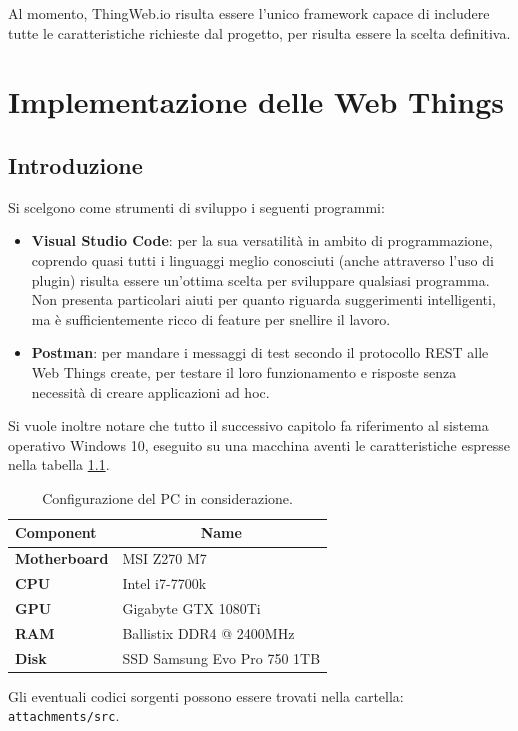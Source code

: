 \documentclass[12pt,a4paper,openright,oneside]{report}
\begin{document}
Al momento, ThingWeb.io risulta essere l'unico framework capace di includere tutte le caratteristiche richieste dal progetto, per risulta essere la scelta definitiva.


\clearpage{\pagestyle{empty}\cleardoublepage}
\chapter{Implementazione delle Web Things}           %
\lhead[\fancyplain{}{\bfseries\thepage}]{\fancyplain{}{\bfseries\rightmark}}  

\section{Introduzione}

Si scelgono come strumenti di sviluppo i seguenti programmi:

\begin{itemize}
	\item \textbf{Visual Studio Code}: per la sua versatilità in ambito di programmazione, coprendo quasi tutti i linguaggi meglio conosciuti (anche attraverso l'uso di plugin) risulta essere un'ottima scelta per sviluppare qualsiasi programma. Non presenta particolari aiuti per quanto riguarda suggerimenti intelligenti, ma è sufficientemente ricco di feature per snellire il lavoro.
	
	\item \textbf{Postman}: per mandare i messaggi di test secondo il protocollo REST alle Web Things create, per testare il loro funzionamento e risposte senza necessità di creare applicazioni ad hoc.
\end{itemize}

Si vuole inoltre notare che tutto il successivo capitolo fa riferimento al sistema operativo Windows 10, eseguito su una macchina aventi le caratteristiche espresse nella tabella \ref{tab:pc-spec}.\\

\begin{table}[h]
	\centering
	\begin{tabular}{|l|l|}
		\hline
		\textbf{Component}   & \multicolumn{1}{c|}{\textbf{Name}} \\ \hline
		\textbf{Motherboard} & MSI Z270 M7                        \\ \hline
		\textbf{CPU}         & Intel i7-7700k                     \\ \hline
		\textbf{GPU}         & Gigabyte GTX 1080Ti                \\ \hline
		\textbf{RAM}         & Ballistix DDR4 @ 2400MHz           \\ \hline
		\textbf{Disk}        & SSD Samsung Evo Pro 750 1TB                \\ \hline
	\end{tabular}
	\caption{\label{tab:pc-spec} Configurazione del PC in considerazione.}
\end{table}
Gli eventuali codici sorgenti possono essere trovati nella cartella:\\ \texttt{attachments/src}.
\end{document}
